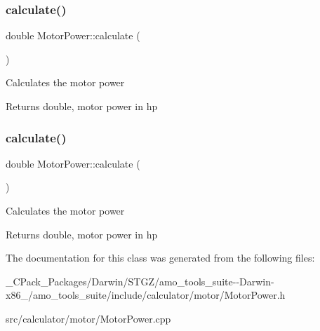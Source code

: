\mbox{\label{class_motor_power_a0beab572e5c46a01e474d6403ec81cf4}} 
\subsubsection{\texorpdfstring{calculate()}{calculate()}\hspace{0.1cm}{\footnotesize\ttfamily [2/3]}}
{\footnotesize\ttfamily double Motor\+Power\+::calculate (\begin{DoxyParamCaption}{ }\end{DoxyParamCaption})}

Calculates the motor power \begin{DoxyReturn}{Returns}
double, motor power in hp 
\end{DoxyReturn}
\mbox{\label{class_motor_power_a0beab572e5c46a01e474d6403ec81cf4}} 
\subsubsection{\texorpdfstring{calculate()}{calculate()}\hspace{0.1cm}{\footnotesize\ttfamily [3/3]}}
{\footnotesize\ttfamily double Motor\+Power\+::calculate (\begin{DoxyParamCaption}{ }\end{DoxyParamCaption})}

Calculates the motor power \begin{DoxyReturn}{Returns}
double, motor power in hp 
\end{DoxyReturn}


The documentation for this class was generated from the following files\+:\begin{DoxyCompactItemize}
\item 
\+\_\+\+C\+Pack\+\_\+\+Packages/\+Darwin/\+S\+T\+G\+Z/amo\+\_\+tools\+\_\+suite-\/-\/\+Darwin-\/x86\+\_/amo\+\_\+tools\+\_\+suite/include/calculator/motor/Motor\+Power.\+h\item 
src/calculator/motor/Motor\+Power.\+cpp\end{DoxyCompactItemize}
